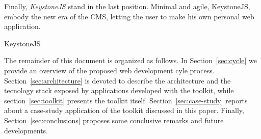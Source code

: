 Finally, {\em KeystoneJS} stand in the last position. Minimal and agile, KeystoneJS, embody the new era of the CMS, letting the user to make his own personal web application.



KeystoneJS





The remainder of this document is organized as follows. In
Section~\ref{sec:cycle} we provide an overview of the proposed web development cyle process. Section~\ref{sec:architecture} is devoted to describe the architecture and the tecnology stack exposed by applications developed with the toolkit, while section~\ref{sec:toolkit} presents the toolkit itself. Section~\ref{sec:case-study} reports about a case-study application of the toolkit discussed in this paper. Finally, Section~\ref{sec:conclusions} proposes some conclusive remarks and future developments.





